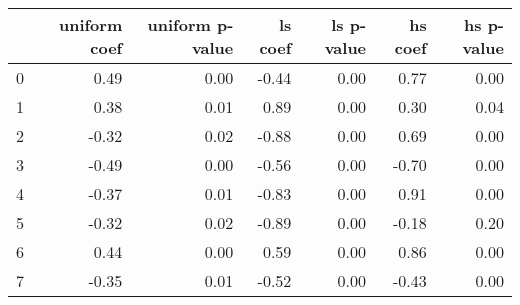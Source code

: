 \begin{tabular}{lrrrrrr}
\toprule
 & uniform coef & uniform p-value & ls coef & ls p-value & hs coef & hs p-value \\
\midrule
0 & 0.49 & 0.00 & -0.44 & 0.00 & 0.77 & 0.00 \\
1 & 0.38 & 0.01 & 0.89 & 0.00 & 0.30 & 0.04 \\
2 & -0.32 & 0.02 & -0.88 & 0.00 & 0.69 & 0.00 \\
3 & -0.49 & 0.00 & -0.56 & 0.00 & -0.70 & 0.00 \\
4 & -0.37 & 0.01 & -0.83 & 0.00 & 0.91 & 0.00 \\
5 & -0.32 & 0.02 & -0.89 & 0.00 & -0.18 & 0.20 \\
6 & 0.44 & 0.00 & 0.59 & 0.00 & 0.86 & 0.00 \\
7 & -0.35 & 0.01 & -0.52 & 0.00 & -0.43 & 0.00 \\
\bottomrule
\end{tabular}
